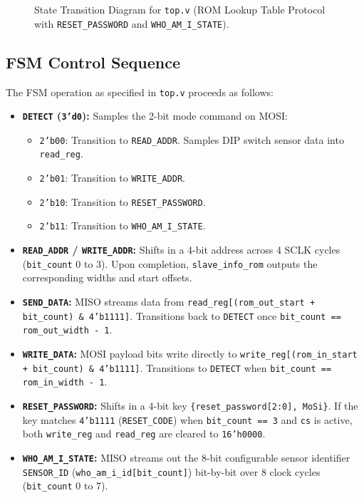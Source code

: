 \documentclass[conference]{IEEEtran}
\begin{document}
\begin{figure}[htbp]
{%
}
\caption{State Transition Diagram for \texttt{top.v} (ROM Lookup Table Protocol with \texttt{RESET\_PASSWORD} and \texttt{WHO\_AM\_I\_STATE}).}
\label{fig:fsm_method2}
\end{figure}

\subsection{FSM Control Sequence}
The FSM operation as specified in \texttt{top.v} proceeds as follows:
\begin{itemize}
    \item \textbf{\texttt{DETECT} (\texttt{3'd0}):} Samples the 2-bit mode command on MOSI:
        \begin{itemize}
            \item \texttt{2'b00}: Transition to \texttt{READ\_ADDR}. Samples DIP switch sensor data into \texttt{read\_reg}.
            \item \texttt{2'b01}: Transition to \texttt{WRITE\_ADDR}.
            \item \texttt{2'b10}: Transition to \texttt{RESET\_PASSWORD}.
            \item \texttt{2'b11}: Transition to \texttt{WHO\_AM\_I\_STATE}.
        \end{itemize}
    \item \textbf{\texttt{READ\_ADDR} / \texttt{WRITE\_ADDR}:} Shifts in a 4-bit address across 4 SCLK cycles (\texttt{bit\_count} 0 to 3). Upon completion, \texttt{slave\_info\_rom} outputs the corresponding widths and start offsets.
    \item \textbf{\texttt{SEND\_DATA}:} MISO streams data from \texttt{read\_reg[(rom\_out\_start + bit\_count) \& 4'b1111]}. Transitions back to \texttt{DETECT} once \texttt{bit\_count == rom\_out\_width - 1}.
    \item \textbf{\texttt{WRITE\_DATA}:} MOSI payload bits write directly to \texttt{write\_reg[(rom\_in\_start + bit\_count) \& 4'b1111]}. Transitions to \texttt{DETECT} when \texttt{bit\_count == rom\_in\_width - 1}.
    \item \textbf{\texttt{RESET\_PASSWORD}:} Shifts in a 4-bit key \texttt{\{reset\_password[2:0], MoSi\}}. If the key matches \texttt{4'b1111} (\texttt{RESET\_CODE}) when \texttt{bit\_count == 3} and \texttt{cs} is active, both \texttt{write\_reg} and \texttt{read\_reg} are cleared to \texttt{16'h0000}.
    \item \textbf{\texttt{WHO\_AM\_I\_STATE}:} MISO streams out the 8-bit configurable sensor identifier \texttt{SENSOR\_ID} (\texttt{who\_am\_i\_id[bit\_count]}) bit-by-bit over 8 clock cycles (\texttt{bit\_count} 0 to 7).
\end{itemize}
\end{document}

